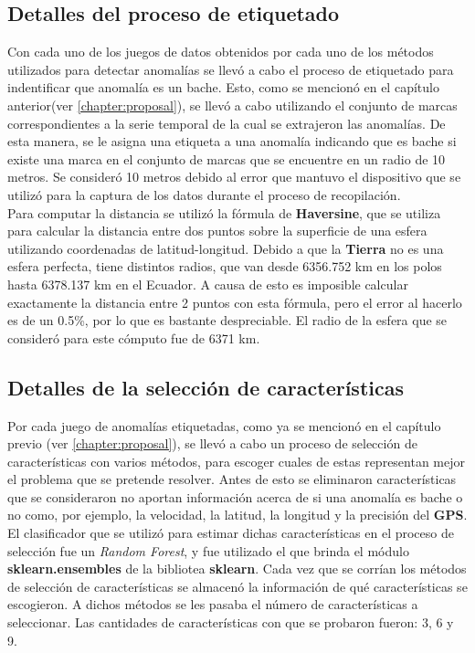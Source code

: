 	\subsection{Detalles del proceso de etiquetado}
		Con cada uno de los juegos de datos obtenidos por cada uno de los métodos utilizados para detectar anomalías se llevó a cabo
		el proceso de etiquetado para indentificar que anomalía es un bache. Esto, como se mencionó en el capítulo anterior(ver \ref{chapter:proposal}),
		se llevó a cabo utilizando el conjunto de marcas correspondientes a la serie temporal de la cual se extrajeron las anomalías. De esta manera, se
		le asigna una etiqueta a una anomalía indicando que es bache si existe una marca en el conjunto de marcas que se encuentre en un radio de 10
		metros. Se consideró 10 metros debido al error que mantuvo el dispositivo que se utilizó para la captura de los datos durante el proceso de
		recopilación.\\
		\indent Para computar la distancia se utilizó la fórmula de \textbf{Haversine}, que se utiliza para calcular la distancia entre dos puntos sobre la
		superficie de una esfera utilizando coordenadas de latitud-longitud. Debido a que la \textbf{Tierra} no es una esfera perfecta, tiene
		distintos radios, que van desde 6356.752 km en los polos hasta 6378.137 km en el Ecuador. A causa de esto es imposible calcular exactamente la
		distancia entre 2 puntos con esta fórmula, pero el error al hacerlo es de un 0.5\%, por lo que es bastante despreciable. El radio de la esfera
		que se consideró para este cómputo fue de 6371 km.\\

	\subsection{Detalles de la selección de características}
		Por cada juego de anomalías etiquetadas, como ya se mencionó en el capítulo previo (ver \ref{chapter:proposal}), se llevó a cabo un proceso
		de selección de características con varios métodos, para escoger cuales de estas representan mejor el problema que se pretende resolver.
		Antes de esto se eliminaron características que se consideraron no aportan información acerca de si una anomalía es bache o no como, por ejemplo,
		la velocidad, la latitud, la longitud y la precisión del \textbf{GPS}.\\
		\indent El clasificador que se utilizó para estimar dichas características en el proceso de selección fue un \emph{Random Forest}, y fue
		utilizado el que brinda el módulo \textbf{sklearn.ensembles} de la bibliotea \textbf{sklearn}. Cada vez que se corrían los métodos de selección
		de características se almacenó la información de qué características se escogieron. A dichos métodos se les pasaba el número de
		características a seleccionar. Las cantidades de características con que se probaron fueron: 3, 6 y 9.\\

